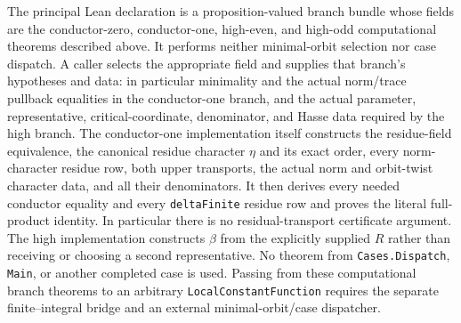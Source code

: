 \begin{theorem}
\leanok
{}
\FormalizationContract The principal Lean declaration is a proposition-valued
branch bundle whose fields are the conductor-zero, conductor-one, high-even,
and high-odd computational theorems described above.  It performs neither
minimal-orbit selection nor case dispatch.  A caller selects the appropriate
field and supplies that branch's hypotheses and data: in particular
minimality and the actual norm/trace pullback equalities in the conductor-one
branch, and the actual parameter, representative, critical-coordinate,
denominator, and Hasse data required by the high branch.  The conductor-one
implementation itself constructs the residue-field equivalence, the
canonical residue character $\eta$ and its exact order, every norm-character
residue row, both upper transports, the actual norm and orbit-twist character
data, and all their denominators.  It then derives every needed conductor
equality and every \texttt{deltaFinite} residue row and proves the literal
full-product identity.  In particular there is no residual-transport
certificate argument.  The high implementation constructs $\beta$ from the
explicitly supplied $R$ rather than receiving or choosing a second
representative.  No theorem from \texttt{Cases.Dispatch}, \texttt{Main}, or
another completed case is used.  Passing from these computational branch
theorems to an arbitrary \texttt{LocalConstantFunction} requires the
separate finite--integral bridge and an external minimal-orbit/case
dispatcher.
\end{theorem}

